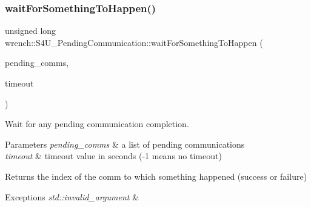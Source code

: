 \subsubsection{\texorpdfstring{wait\+For\+Something\+To\+Happen()}{waitForSomethingToHappen()}\hspace{0.1cm}{\footnotesize\ttfamily [1/2]}}
{\footnotesize\ttfamily unsigned long wrench\+::\+S4\+U\+\_\+\+Pending\+Communication\+::wait\+For\+Something\+To\+Happen (\begin{DoxyParamCaption}\item[{std\+::vector$<$ std\+::unique\+\_\+ptr$<$ \hyperlink{classwrench_1_1_s4_u___pending_communication}{S4\+U\+\_\+\+Pending\+Communication} $>$$>$}]{pending\+\_\+comms,  }\item[{double}]{timeout }\end{DoxyParamCaption})\hspace{0.3cm}{\ttfamily [static]}}



Wait for any pending communication completion. 


\begin{DoxyParams}{Parameters}
{\em pending\+\_\+comms} & a list of pending communications \\
\hline
{\em timeout} & timeout value in seconds (-\/1 means no timeout)\\
\hline
\end{DoxyParams}
\begin{DoxyReturn}{Returns}
the index of the comm to which something happened (success or failure)
\end{DoxyReturn}

\begin{DoxyExceptions}{Exceptions}
{\em std\+::invalid\+\_\+argument} & \\
\hline
\end{DoxyExceptions}
\mbox{\label{classwrench_1_1_s4_u___pending_communication_af599fef5903e9e1471deead0d4f5ca38}} 
